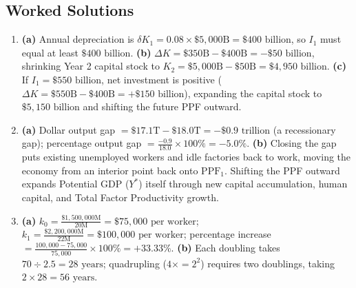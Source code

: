\documentclass[11pt,letterpaper]{article}
\begin{document}
\subsection*{Worked Solutions}
\begin{enumerate}
  \item \textbf{(a)} Annual depreciation is $\delta K_1 = 0.08 \times \$5,000\text{B} = \$400\text{ billion}$, so $I_1$ must equal at least $\$400\text{ billion}$. \textbf{(b)} $\Delta K = \$350\text{B} - \$400\text{B} = -\$50\text{ billion}$, shrinking Year 2 capital stock to $K_2 = \$5,000\text{B} - \$50\text{B} = \$4,950\text{ billion}$. \textbf{(c)} If $I_1 = \$550\text{ billion}$, net investment is positive ($\Delta K = \$550\text{B} - \$400\text{B} = +\$150\text{ billion}$), expanding the capital stock to $\$5,150\text{ billion}$ and shifting the future PPF outward.
  \item \textbf{(a)} Dollar output gap $= \$17.1\text{T} - \$18.0\text{T} = -\$0.9\text{ trillion}$ (a recessionary gap); percentage output gap $= \frac{-0.9}{18.0} \times 100\% = -5.0\%$. \textbf{(b)} Closing the gap puts existing unemployed workers and idle factories back to work, moving the economy from an interior point back onto $\text{PPF}_1$. Shifting the PPF outward expands Potential GDP ($Y^*$) itself through new capital accumulation, human capital, and Total Factor Productivity growth.
  \item \textbf{(a)} $k_0 = \frac{\$1,500,000\text{M}}{20\text{M}} = \$75,000\text{ per worker}$; $k_1 = \frac{\$2,200,000\text{M}}{22\text{M}} = \$100,000\text{ per worker}$; percentage increase $= \frac{100,000 - 75,000}{75,000} \times 100\% = +33.33\%$. \textbf{(b)} Each doubling takes $70 \div 2.5 = 28\text{ years}$; quadrupling ($4\times = 2^2$) requires two doublings, taking $2 \times 28 = 56\text{ years}$.
\end{enumerate}
\end{document}
